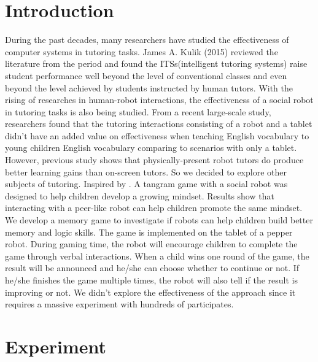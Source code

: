 \documentclass[a4paper, 12pt]{article}
\begin{document}
\section{Introduction}
During the past decades, many researchers have studied the effectiveness of computer systems in tutoring tasks. James A. Kulik (2015)\cite{0034654315581420} reviewed the literature from the period and found the ITSs(intelligent tutoring systems) raise student performance well beyond the level of conventional classes and even beyond the level achieved by students instructed by human tutors. With the rising of researches in human-robot interactions, the effectiveness of a social robot in tutoring tasks is also being studied. From a recent large-scale study\cite{8673077}, researchers found that the tutoring interactions consisting of a robot and a tablet didn't have an added value on effectiveness when teaching English vocabulary to young children English vocabulary comparing to scenarios with only a tablet. However, previous study shows that physically-present robot tutors do produce better learning gains than on-screen tutors\cite{Leyzberg_thephysical}. So we decided to explore other subjects of tutoring. Inspired by  \cite{Park:2017:GGM:2909824.3020213}. A tangram game with a social robot was designed to help children develop a growing mindset. Results show that interacting with a peer-like robot can help children promote the same mindset. We develop a memory game to investigate if robots can help children build better memory and logic skills. The game is implemented on the tablet of a pepper robot. During gaming time, the robot will encourage children to complete the game through verbal interactions. When a child wins one round of the game, the result will be announced and he/she can choose whether to continue or not. If he/she finishes the game multiple times, the robot will also tell if the result is improving or not. We didn't explore the effectiveness of the approach since it requires a massive experiment with hundreds of participates.

\section{Experiment}
\end{document}
